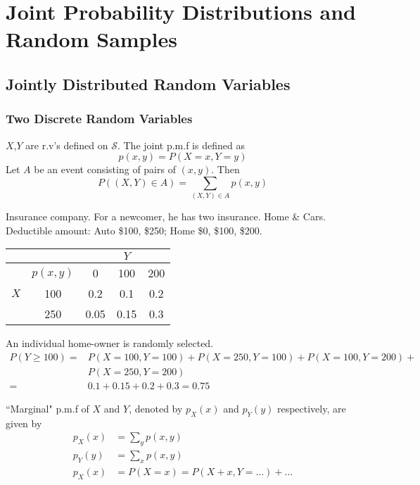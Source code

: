 \chapter[Joint Probability Distributions]{Joint Probability Distributions and Random Samples}
\section{Jointly Distributed Random Variables}
\subsection{Two Discrete Random Variables}
$X$,$Y$ are r.v's defined on $\mathcal{S}$. The joint p.m.f is defined as 
\[p(x,y)=P(X=x,Y=y)\]
Let $A$ be an event consisting of pairs of $(x,y)$. Then
\[P\left((X,Y)\in A\right) = \sum_{(X,Y)\in A}p(x,y)\]

\begin{exmp}
Insurance company. For a newcomer, he has two insurance. Home \& Cars. Deductible amount: Auto \$100, \$250; Home \$0, \$100, \$200.
\begin{center}
\begin{tabular}{c|c|ccc}
\hline  \hline
    &     &    & $Y$ &   \\
\hline
    & $p(x,y)$ & 0    & 100  & 200  \\
$X$ & 100      & 0.2  & 0.1  & 0.2  \\
    & 250      & 0.05 & 0.15 & 0.3  \\
\hline
\end{tabular}
\end{center}
An individual home-owner is randomly selected.
\begin{align*}
P(Y \geq 100)=& P(X=100, Y=100)+P(X=250, Y=100)+P(X=100, Y=200)+\\
&P(X=250, Y=200)\\
=& 0.1+0.15+0.2+0.3=0.75
\end{align*}
\end{exmp}

\begin{defn}
``Marginal" p.m.f of $X$ and $Y$, denoted by $p_X(x)$ and $p_Y(y)$ respectively, are given by
\begin{align*}
p_X(x)&=\sum_{y}p(x,y)	\\
p_Y(y)&=\sum_{x}p(x,y)	\\
p_X(x)&=P(X=x)=P(X+x,Y=\dots)+\dots
\end{align*}
\end{defn}

